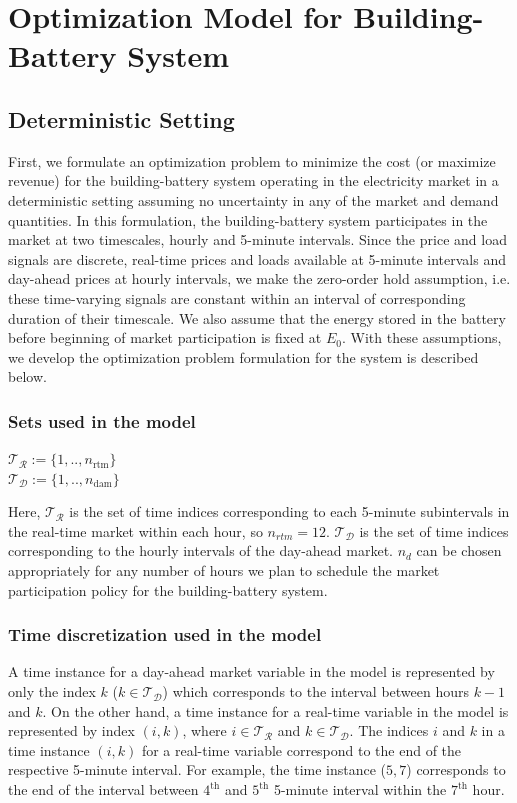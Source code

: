 \documentclass[11pt,twoside]{article}
\begin{document}
\section{Optimization Model for Building-Battery System}\label{sec:model}
\subsection{Deterministic Setting}\label{subsec:deterministic}
First, we formulate an optimization problem to minimize the cost (or maximize revenue) for the building-battery system operating in the electricity market in a deterministic setting assuming no uncertainty in any of the market and demand quantities. In this formulation, the building-battery system participates in the market at two timescales, hourly and 5-minute intervals. Since the price and load signals are discrete, real-time prices and loads available at 5-minute intervals and day-ahead prices at hourly intervals, we make the zero-order hold assumption, i.e. these time-varying signals are constant within an interval of corresponding duration of their timescale. We also assume that the energy stored in the battery before beginning of market participation is fixed at $E_{0}$. With these assumptions, we develop the optimization problem formulation for the system is described below.
\subsubsection{Sets used in the model}
\begin{center}
$\mathcal{T_R} := \{1,..,n_{\textrm{rtm}}\}$\\$ \mathcal{T_D} :=  \{1,..,n_{\textrm{dam}}\}$
\end{center}
Here, $\mathcal{T_R}$ is the set of time indices corresponding to each 5-minute subintervals in the real-time market within each hour, so $n_{rtm}=12$. $\mathcal{T_D}$ is the set of time indices corresponding to the hourly intervals of the day-ahead market. $n_d$ can be chosen appropriately for any number of hours we plan to schedule the market participation policy for the building-battery system.
\subsubsection{Time discretization used in the model}
A time instance for a day-ahead market variable in the model is represented by only the index $k$ ($k \in \mathcal{T_D}$) which corresponds to the interval between hours $k-1$ and $k$. On the other hand, a time instance for a real-time variable in the model is represented by index $(i,k)$, where $i \in \mathcal{T_R}$ and $ k \in \mathcal{T_D}$. The indices $i$ and $k$ in a time instance $(i,k)$ for a real-time variable correspond to the end of the respective 5-minute interval. For example, the time instance ($5,7$) corresponds to the end of the interval between $4^{\text{th}}$ and $5^{\text{th}}$ 5-minute interval within the $7^\textrm{th}$ hour. 
\end{document}
